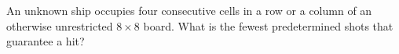 An unknown ship occupies four consecutive cells in a row or a column of an otherwise unrestricted $8\times8$ board. What is the fewest predetermined shots that guarantee a hit?
